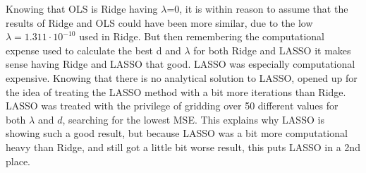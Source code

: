 \documentclass[../main.tex]{subfiles}
\begin{document}
Knowing that OLS is Ridge having $\lambda$=0, it is within reason to assume that the results of Ridge and OLS could have been more similar, due to the low $\lambda=1.311\cdot10^{-10}$ used in Ridge. But then remembering the computational expense used to calculate the best d and $\lambda$ for both Ridge and LASSO it makes sense having Ridge and LASSO that good. LASSO was especially computational expensive. Knowing that there is no analytical solution to LASSO, opened up for the idea of treating the LASSO method with a bit more iterations than Ridge. LASSO was treated with the privilege of gridding over 50 different values for both $\lambda$ and $d$, searching for the lowest MSE. This explains why LASSO is showing such a good result, but because LASSO was a bit more computational heavy than Ridge, and still got a little bit worse result, this puts LASSO in a 2nd place.
\end{document}
